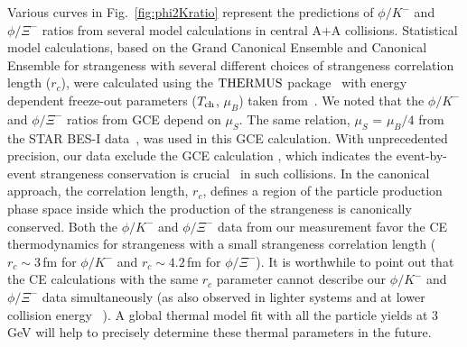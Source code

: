 \documentclass[%
 reprint,	
showpacs,
 amsmath,amssymb,
 aps,
 superscriptaddress,
]{revtex4-1}
\begin{document}
Various curves in Fig.~\ref{fig:phi2Kratio} represent the predictions of $\phi/K^-$ and $\phi/\Xi^-$ ratios from several model calculations in central A+A collisions. Statistical model calculations, based on the Grand Canonical Ensemble and Canonical Ensemble for strangeness with several different choices of strangeness correlation length ($r_c$), were calculated using the $\textup{THERMUS}$ package~\cite{THERMUS_WHEATON200984} with energy dependent freeze-out parameters ($T_{\rm ch}$, $\mu_B$) taken from~\cite{Andronic_2018Naure}. %
We noted that the $\phi/K^-$ and $\phi/\Xi^-$ ratios from GCE depend on $\mu_{S}$. The same relation, $\mu_{S}$ = $\mu_{B}/4$ from the STAR BES-I data~\cite{star_bes_strangeness}, was used in this GCE calculation. 
With unprecedented precision, our data exclude the GCE calculation %
, which indicates the event-by-event strangeness conservation %
is crucial~\cite{BraunMunzinger:2003zd} in such collisions. In the canonical approach, the correlation length, $r_c$, defines a region of the particle production phase space inside which the production of the strangeness is canonically conserved. Both the $\phi/K^-$ and $\phi/\Xi^-$ data from our measurement favor the CE thermodynamics for strangeness with a small strangeness correlation length ($r_c \sim 3$\,fm for $\phi/K^-$ and $r_c \sim 4.2$\,fm for $\phi/\Xi^-$). It is worthwhile to point out that the CE calculations with the same $r_c$ parameter cannot describe our $\phi/K^-$ and $\phi/\Xi^-$ data simultaneously (as also observed in lighter systems and at lower collision energy ~\cite{HADES_phi_ArKCl}). %
A global thermal model fit with all the particle yields at 3\,GeV will help to precisely determine these thermal parameters in the future.
\end{document}
